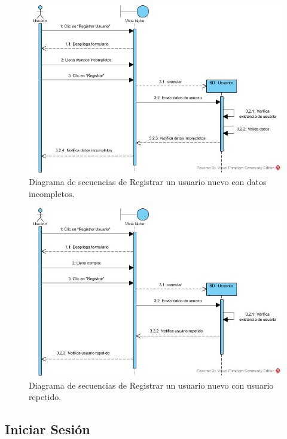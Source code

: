 \begin{figure}[htbp!]
\centering
\includegraphics[width=1\textwidth]{images/Registrar_trayectoria_b}
\caption{Diagrama de secuencias de Registrar un usuario nuevo con datos incompletos.}
\end{figure}

\begin{figure}[htbp!]
\centering
\includegraphics[width=1\textwidth]{images/Registrar_trayectoria_c}
\caption{Diagrama de secuencias de Registrar un usuario nuevo con usuario repetido.}
\end{figure} 
\newpage

\subsection{Iniciar Sesión}

